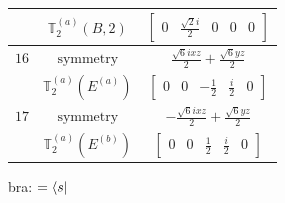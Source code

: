 \documentclass[fleqn,8pt,landscape]{jsarticle}
\begin{document}
\begin{longtable}{ccc}
$  $ & $ \mathbb{T}_{2}^{(a)}(B,2) $ & $ \begin{bmatrix} 0 & \frac{\sqrt{2} i}{2} & 0 & 0 & 0 \end{bmatrix} $ \\ \hline
$ 16 $ & $ \text{symmetry} $ & $ \frac{\sqrt{6} i x z}{2} + \frac{\sqrt{6} y z}{2} $ \\
$  $ & $ \mathbb{T}_{2}^{(a)}(E^{(a)}) $ & $ \begin{bmatrix} 0 & 0 & - \frac{1}{2} & \frac{i}{2} & 0 \end{bmatrix} $ \\ \hline
$ 17 $ & $ \text{symmetry} $ & $ - \frac{\sqrt{6} i x z}{2} + \frac{\sqrt{6} y z}{2} $ \\
$  $ & $ \mathbb{T}_{2}^{(a)}(E^{(b)}) $ & $ \begin{bmatrix} 0 & 0 & \frac{1}{2} & \frac{i}{2} & 0 \end{bmatrix} $ \\ \hline
\end{longtable}
bra: $=\bra{s}$
\end{document}
